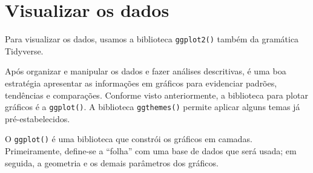 \documentclass[
  10pt,
  brazil,
  a4paper,
  twoside, notitlepage, openright]{book}
\newenvironment{Shaded}{\begin{snugshade}}{\end{snugshade}}
\newcommand{\CommentTok}[1]{\textcolor[rgb]{0.56,0.35,0.01}{\textit{#1}}}
\newcommand{\DataTypeTok}[1]{\textcolor[rgb]{0.13,0.29,0.53}{#1}}
\newcommand{\DecValTok}[1]{\textcolor[rgb]{0.00,0.00,0.81}{#1}}
\newcommand{\KeywordTok}[1]{\textcolor[rgb]{0.13,0.29,0.53}{\textbf{#1}}}
\newcommand{\NormalTok}[1]{#1}
\newcommand{\OperatorTok}[1]{\textcolor[rgb]{0.81,0.36,0.00}{\textbf{#1}}}
\newcommand{\StringTok}[1]{\textcolor[rgb]{0.31,0.60,0.02}{#1}}
\begin{document}
\begin{Shaded}
\end{Shaded}

\hypertarget{visualizar-os-dados}{%
\chapter{Visualizar os dados}\label{visualizar-os-dados}}

Para visualizar os dados, usamos a biblioteca \texttt{ggplot2()} também da gramática Tidyverse.

Após organizar e manipular os dados e fazer análises descritivas, é uma boa estratégia apresentar as informações em gráficos para evidenciar padrões, tendências e comparações. Conforme visto anteriormente, a biblioteca para plotar gráficos é a \texttt{ggplot()}. A biblioteca \texttt{ggthemes()} permite aplicar alguns temas já pré-estabelecidos.

O \texttt{ggplot()} é uma biblioteca que constrói os gráficos em camadas. Primeiramente, define-se a ``folha'' com uma base de dados que será usada; em seguida, a geometria e os demais parâmetros dos gráficos.
\end{document}
